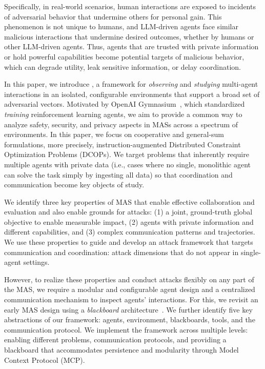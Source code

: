 Specifically, in real-world scenarios, human interactions are exposed to incidents of adversarial behavior that undermine others for personal gain. This phenomenon is not unique to humans, and LLM-driven agents face similar malicious interactions that undermine desired outcomes, whether by humans or other LLM-driven agents. Thus, agents that are trusted with private information or hold powerful capabilities become potential targets of malicious behavior, which can degrade utility, leak sensitive information, or delay coordination. 

In this paper, we introduce \sys, a framework for \emph{observing} and \emph{studying} multi-agent interactions in an isolated, configurable environments that support a broad set of adversarial vectors. Motivated by OpenAI Gymnasium~\citep{brockman2016openai}, which standardized \emph{training} reinforcement learning agents, 
we aim to provide a common way to analyze safety, security, and privacy aspects in MASs across a spectrum of environments. In this paper, we focus on cooperative and general-sum formulations, more precisely, instruction-augmented Distributed Constraint Optimization Problems (DCOPs). We target problems that inherently require multiple agents with private data (i.e., cases where no single, monolithic agent can solve the task simply by ingesting all data) so that coordination and communication become key objects of study.

We identify three key properties of MAS that enable effective collaboration and evaluation and also enable grounds for attacks: (1) a joint, ground-truth global objective to enable measurable impact, (2) agents with private information and different capabilities, and (3) complex communication patterns and trajectories. We use these properties to guide and develop an attack framework that targets communication and coordination: attack dimensions that do not appear in single-agent settings.

However, to realize these properties and conduct attacks flexibly on any part of the MAS, we require a modular and configurable agent design and a centralized communication mechanism to inspect agents' interactions. For this, we revisit an early MAS design using a \emph{blackboard} architecture~\cite{erman1980hearsay}. We further identify five key abstractions of our \sys framework: agents, environment, blackboards, tools, and the communication protocol. We implement the framework across multiple levels: enabling different problems, communication protocols, and providing a blackboard that accommodates persistence and modularity through Model Context Protocol (MCP).

